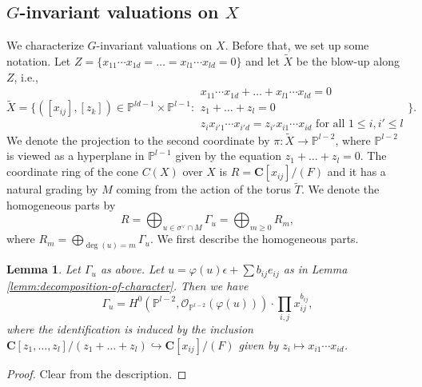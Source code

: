 \documentclass[letterpaper,11pt]{amsart}
\theoremstyle{plain}
\newtheorem{lemm}[theo]{Lemma}
\theoremstyle{definition}
\theoremstyle{remark}
\newcommand{\eps}{\epsilon}
\newcommand{\PP}{\mathbb{P}}
\newcommand{\CC}{\mathbf{C}}
\newcommand{\cO}{\mathcal{O}}
\newcommand{\dual}{^{\vee}}
\begin{document}
    \subsection{$G$-invariant valuations on $X$}
    We characterize $G$-invariant valuations on $X$. Before that, we set up some notation. Let $Z = \{ x_{11}\cdots x_{1d} = \ldots = x_{l1}\cdots x_{ld} = 0\}$ and let $\widetilde{X}$ be the blow-up along $Z$, i.e.,
    $$ \widetilde{X} = \Big\{ ([x_{ij}], [z_{k}])\in \PP^{ld-1} \times \PP^{l-1} : \substack{x_{11}\cdots x_{1d} + \ldots + x_{l1}\cdots x_{ld} = 0\\z_{1} + \ldots + z_{l} = 0\\ z_{i}x_{i'1}\cdots x_{i'd} = z_{i'}x_{i1}\cdots x_{id} \text{ for all } 1 \leq i,i' \leq l} \Big\}.$$
    We denote the projection to the second coordinate by $\pi \colon \widetilde{X} \to \PP^{l-2}$, where $\PP^{l-2}$ is viewed as a hyperplane in $\PP^{l-1}$ given by the equation $z_{1}+ \ldots + z_{l} = 0$. The coordinate ring of the cone $C(X)$ over $X$ is $R = \CC[x_{ij}]/(F)$ and it has a natural grading by $M$ coming from the action of the torus $\widetilde{T}$. We denote the homogeneous parts by
    $$ R = \bigoplus_{u \in \sigma\dual \cap M} \Gamma_{u} = \bigoplus_{m\geq 0} R_{m},$$
    where $R_{m} = \bigoplus_{\deg(u) = m} \Gamma_{u}$. We first describe the homogeneous parts.
    \begin{lemm} \label{lemm:homogeneous-part}
        Let $\Gamma_{u}$ as above. Let $u = \varphi(u)\eps + \sum b_{ij} e_{ij}$ as in Lemma \ref{lemm:decomposition-of-character}. Then we have
        $$ \Gamma_{u} = H^{0}(\PP^{l-2}, \cO_{\PP^{l-2}}(\varphi(u)) )\cdot \prod_{i,j} x_{ij}^{b_{ij}},$$
        where the identification is induced by the inclusion $\CC[z_{1},\ldots, z_{l}]/(z_{1} +\ldots + z_{l}) \hookrightarrow \CC[x_{ij}]/(F)$ given by $z_{i} \mapsto x_{i1}\cdots x_{id}$.
    \end{lemm}
    \begin{proof}
        Clear from the description.
    \end{proof}
    
\end{document}
